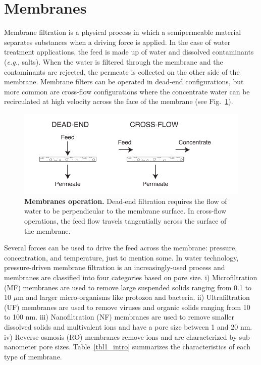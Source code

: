 \section{Membranes}
Membrane filtration is a physical process in which a semipermeable material separates substances when a driving force is applied. In the case of water treatment applications, the feed is made up of water and dissolved contaminants (\textit{e.g.}, salts). When the water is filtered through the membrane and the contaminants are rejected, the permeate is collected on the other side of the membrane. Membrane filters can be operated in dead-end configurations, but more common are cross-flow configurations where the concentrate water can be recirculated at high velocity across the face of the membrane (see Fig.~\ref{fig3_intro}).\cite{baker2004overview}
\begin{figure}
  \centering
  \includegraphics[width=4.5in]{intro/Fig3.pdf}
  \caption{\textbf{Membranes operation.} Dead-end filtration requires the flow of water to be perpendicular to the membrane surface. In cross-flow operations, the feed flow travels tangentially across the surface of the membrane.}
  \label{fig3_intro}
\end{figure}
 
Several forces can be used to drive the feed across the membrane: pressure, concentration, and temperature, just to mention some. In water technology, pressure-driven membrane filtration is an increasingly-used process and membranes are classified into four categories based on pore size. i) Microfiltration (MF) membranes are used to remove large suspended solids ranging from 0.1 to 10 $\mu$m and larger micro-organisms like protozoa and bacteria. ii) Ultrafiltration (UF) membranes are used to remove viruses and organic solids ranging from 10 to 100 nm. iii) Nanofiltration (NF) membranes are used to remove smaller dissolved solids and multivalent ions and have a pore size between 1 and 20 nm. iv) Reverse osmosis (RO) membranes remove ions and are characterized by sub-nanometer pore sizes. Table~\ref{tbl1_intro} summarizes the characteristics of each type of membrane.

